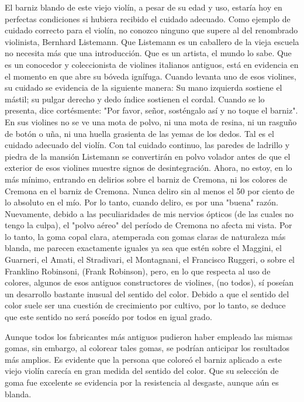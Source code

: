 \documentclass[12pt]{book}
\begin{document}
El barniz blando de este viejo violín, a pesar de su edad y uso, estaría hoy en perfectas condiciones si hubiera recibido el cuidado adecuado. Como ejemplo de cuidado correcto para el violín, no conozco ninguno que supere al del renombrado violinista, Bernhard Listemann. Que Listemann es un caballero de la vieja escuela no necesita más que una introducción. Que es un artista, el mundo lo sabe. Que es un conocedor y coleccionista de violines italianos antiguos, está en evidencia en el momento en que abre su bóveda ignífuga. Cuando levanta uno de esos violines, su cuidado se evidencia de la siguiente manera: Su mano izquierda sostiene el mástil; su pulgar derecho y dedo índice sostienen el cordal. Cuando se lo presenta, dice cortésmente: "Por favor, señor, sosténgalo así y no toque el barniz". En sus violines no se ve una mota de polvo, ni una mota de resina, ni un rasguño de botón o uña, ni una huella grasienta de las yemas de los dedos. Tal es el cuidado adecuado del violín. Con tal cuidado continuo, las paredes de ladrillo y piedra de la mansión Listemann se convertirán en polvo volador antes de que el exterior de esos violines muestre signos de desintegración. Ahora, no estoy, en lo más mínimo, entrando en delirios sobre el barniz de Cremona, ni los colores de Cremona en el barniz de Cremona. Nunca deliro sin al menos el 50 por ciento de lo absoluto en el mío. Por lo tanto, cuando deliro, es por una "buena" razón. Nuevamente, debido a las peculiaridades de mis nervios ópticos (de las cuales no tengo la culpa), el "polvo aéreo" del período de Cremona no afecta mi vista. Por lo tanto, la goma copal clara, atemperada con gomas claras de naturaleza más blanda, me parecen exactamente iguales ya sea que estén sobre el Maggini, el Guarneri, el Amati, el Stradivari, el Montagnani, el Francisco Ruggeri, o sobre el Franklino Robinsoni, (Frank Robinson), pero, en lo que respecta al uso de colores, algunos de esos antiguos constructores de violines, (no todos), sí poseían un desarrollo bastante inusual del sentido del color. Debido a que el sentido del color suele ser una cuestión de crecimiento por cultivo, por lo tanto, se deduce que este sentido no será poseído por todos en igual grado.

Aunque todos los fabricantes más antiguos pudieron haber empleado las mismas gomas, sin embargo, al colorear tales gomas, se podrían anticipar los resultados más amplios. Es evidente que la persona que coloreó el barniz aplicado a este viejo violín carecía en gran medida del sentido del color. Que su selección de goma fue excelente se evidencia por la resistencia al desgaste, aunque aún es blanda.
\end{document}
